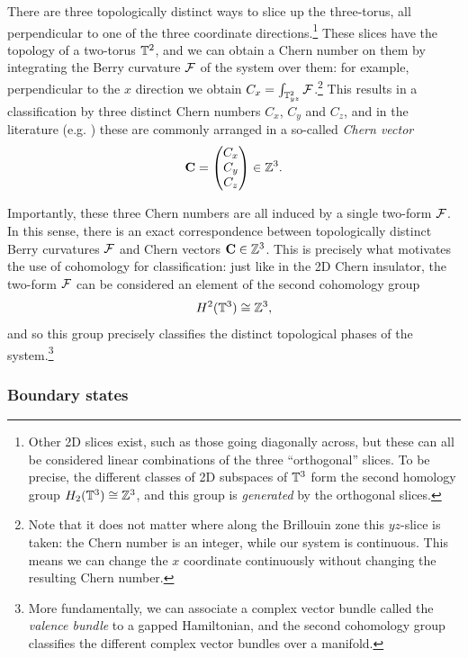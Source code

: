 There are three topologically distinct ways to slice up the three-torus, all perpendicular to one of the three coordinate directions.\footnote{
	Other 2D slices exist, such as those going diagonally across, but these can all be considered linear combinations of the three ``orthogonal'' slices. To be precise, the different classes of 2D subspaces of $\mathbb{T}^3$ form the second homology group $H_2(\mathbb{T}^3)\cong\mathbb{Z}^3$, and this group is \emph{generated} by the orthogonal slices.}
These slices have the topology of a two-torus $\mathbb{T}^2$, and we can obtain a Chern number on them by integrating the Berry curvature $\mathcal{F}$ of the system over them: for example, perpendicular to the $x$ direction we obtain $C_{x} = \int_{\mathbb{T}_{yz}^2}\mathcal{F}$.\footnote{
	Note that it does not matter where along the Brillouin zone this $yz$-slice is taken: the Chern number is an integer, while our system is continuous. This means we can change the $x$ coordinate continuously without changing the resulting Chern number.}
This results in a classification by three distinct Chern numbers $C_x$, $C_y$ and $C_z$, and in the literature (e.g. \cites{Vanderbilt_2018}{Liu_photonic-Chern-vector}) these are commonly arranged in a so-called \emph{Chern vector}
\[
	\vb{C} = \begin{pmatrix}
		C_x \\ C_y \\ C_z
	\end{pmatrix} \in \mathbb{Z}^3.
\]

Importantly, these three Chern numbers are all induced by a single two-form $\mathcal{F}$. In this sense, there is an exact correspondence between topologically distinct Berry curvatures $\mathcal{F}$ and Chern vectors $\vb{C}\in\mathbb{Z}^3$. This is precisely what motivates the use of cohomology for classification: just like in the 2D Chern insulator, the two-form $\mathcal{F}$ can be considered an element of the second cohomology group
\begin{equation}
	H^2(\mathbb{T}^3)\cong\mathbb{Z}^3,
\end{equation}
and so this group precisely classifies the distinct topological phases of the system.\footnote{
	More fundamentally, we can associate a complex vector bundle called the \emph{valence bundle} to a gapped Hamiltonian, and the second cohomology group classifies the different complex vector bundles over a manifold.}

\subsubsection{Boundary states}

